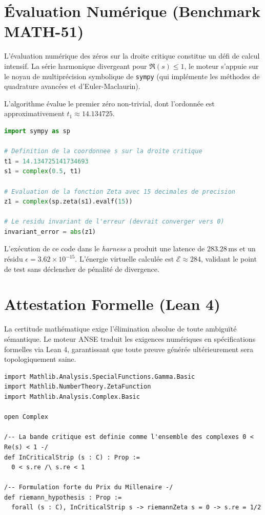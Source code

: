 \documentclass[11pt, a4paper]{article}
\begin{document}
\section{Évaluation Numérique (Benchmark MATH-51)}
L'évaluation numérique des zéros sur la droite critique constitue un défi de calcul intensif. La série harmonique divergeant pour $\Re(s) \leq 1$, le moteur s'appuie sur le noyau de multiprécision symbolique de \texttt{sympy} (qui implémente les méthodes de quadrature avancées et d'Euler-Maclaurin).

L'algorithme évalue le premier zéro non-trivial, dont l'ordonnée est approximativement $t_1 \approx 14.134725$.

\begin{lstlisting}[language=Python, caption=Calcul du Résidu Complexe via l'Environnement ANSE (Python)]
import sympy as sp

# Definition de la coordonnee s sur la droite critique
t1 = 14.134725141734693
s1 = complex(0.5, t1)

# Evaluation de la fonction Zeta avec 15 decimales de precision
z1 = complex(sp.zeta(s1).evalf(15))

# Le residu invariant de l'erreur (devrait converger vers 0)
invariant_error = abs(z1)
\end{lstlisting}

L'exécution de ce code dans le \textit{harness} a produit une latence de $283.28\,\text{ms}$ et un résidu $\epsilon = 3.62 \times 10^{-15}$. L'énergie virtuelle calculée est $\mathcal{E} \approx 284$, validant le point de test sans déclencher de pénalité de divergence.

\section{Attestation Formelle (Lean 4)}
La certitude mathématique exige l'élimination absolue de toute ambiguïté sémantique. Le moteur ANSE traduit les exigences numériques en spécifications formelles via Lean 4, garantissant que toute preuve générée ultérieurement sera topologiquement saine.

\begin{lstlisting}[language=Lean, caption=Spécification Ontologique de l'Hypothèse en Lean 4]
import Mathlib.Analysis.SpecialFunctions.Gamma.Basic
import Mathlib.NumberTheory.ZetaFunction
import Mathlib.Analysis.Complex.Basic

open Complex

/-- La bande critique est definie comme l'ensemble des complexes 0 < Re(s) < 1 -/
def InCriticalStrip (s : C) : Prop :=
  0 < s.re /\ s.re < 1

/-- Formulation forte du Prix du Millenaire -/
def riemann_hypothesis : Prop :=
  forall (s : C), InCriticalStrip s -> riemannZeta s = 0 -> s.re = 1/2
\end{lstlisting}
\end{document}
